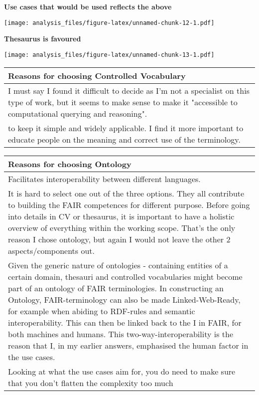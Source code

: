 \documentclass[]{article}
\begin{document}
\textbf{Use cases that would be used reflects the above}

\texttt{[image: analysis\_files/figure-latex/unnamed-chunk-12-1.pdf]}

\textbf{Thesaurus is favoured}

\texttt{[image: analysis\_files/figure-latex/unnamed-chunk-13-1.pdf]}

\begin{table}[H]
\centering
\begin{tabular}{>{\raggedright\arraybackslash\columncolor{khaki}}p{30em}}
\hline
Reasons for choosing Controlled Vocabulary\\
\hline
I must say I found it difficult to decide as I'm not a specialist on this type of work, but it seems to make sense to make it "accessible to computational querying and reasoning".\\
\hline
to keep it simple and widely applicable. I find it more important to educate people on the meaning and correct use of the terminology.\\
\hline
\end{tabular}
\end{table}

\begin{table}[H]
\centering
\begin{tabular}{>{\raggedright\arraybackslash\columncolor{khaki}}p{30em}}
\hline
Reasons for choosing Ontology\\
\hline
Facilitates interoperability between different languages.\\
\hline
It is hard to select one out of the three options. They all contribute to building the FAIR competences for different purpose. Before going into details in CV or thesaurus, it is important to have a holistic overview of everything within the working scope. That's the only reason I chose ontology, but again I would not leave the other 2 aspects/components out.\\
\hline
Given the generic nature of ontologies - containing entities of a certain domain, thesauri and controlled vocabularies might become part of an ontology of FAIR terminologies. In constructing an Ontology, FAIR-terminology can also be made Linked-Web-Ready, for example when abiding to RDF-rules and semantic interoperability. This can then be linked back to the I in FAIR, for both machines and humans. This two-way-interoperability is the reason that I, in my earlier answers, emphasised the human factor in the use cases.\\
\hline
Looking at what the use cases aim for, you do need to make sure that you don't flatten the complexity too much\\
\hline
\end{tabular}
\end{table}
\end{document}
